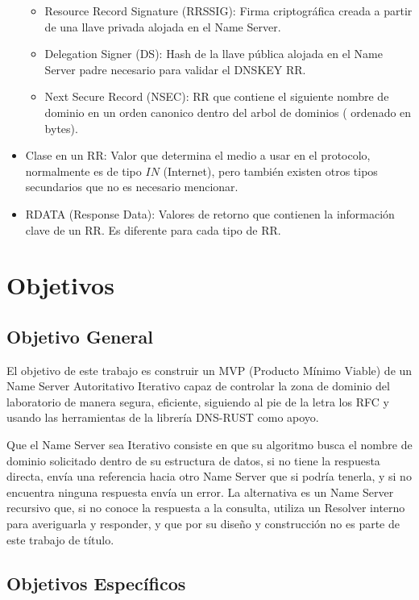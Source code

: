 \begin{itemize}
\begin{itemize}
            \item  Resource Record Signature (RRSSIG): Firma criptográfica creada a partir de una llave privada alojada en el Name Server.
            \item Delegation Signer (DS): Hash de la llave pública alojada en el Name Server padre necesario para validar el DNSKEY RR.
            \item Next Secure Record (NSEC): RR que contiene el siguiente nombre de dominio en un orden canonico dentro del arbol de dominios (
                ordenado en bytes).
        \end{itemize}
    \item Clase en un RR: Valor que determina el medio a usar en el protocolo, normalmente es de tipo $IN$ (Internet), pero también existen 
    otros tipos secundarios que no es necesario mencionar.
    \item RDATA (Response Data): Valores de retorno que contienen la información clave de un RR. Es diferente para cada tipo de RR.
\end{itemize}

\section{Objetivos}

\subsection*{Objetivo General}

El objetivo de este trabajo es construir un MVP (Producto Mínimo Viable) de un Name Server Autoritativo Iterativo capaz de controlar la zona de 
dominio del laboratorio de manera segura, eficiente, siguiendo al pie de la letra los RFC y usando las herramientas de la librería DNS-RUST como 
apoyo.

Que el Name Server sea Iterativo consiste en que su algoritmo busca el nombre de dominio solicitado dentro de su estructura de datos, si no 
tiene la respuesta directa, envía una referencia hacia otro Name Server que si podría tenerla, y si no encuentra ninguna respuesta envía un 
error. La alternativa es un Name Server recursivo que, si no conoce la respuesta a la consulta, utiliza un Resolver interno para averiguarla y 
responder, y que por su diseño y construcción no es parte de este trabajo de título.

\subsection*{Objetivos Específicos}\label{sec:obj-e}

